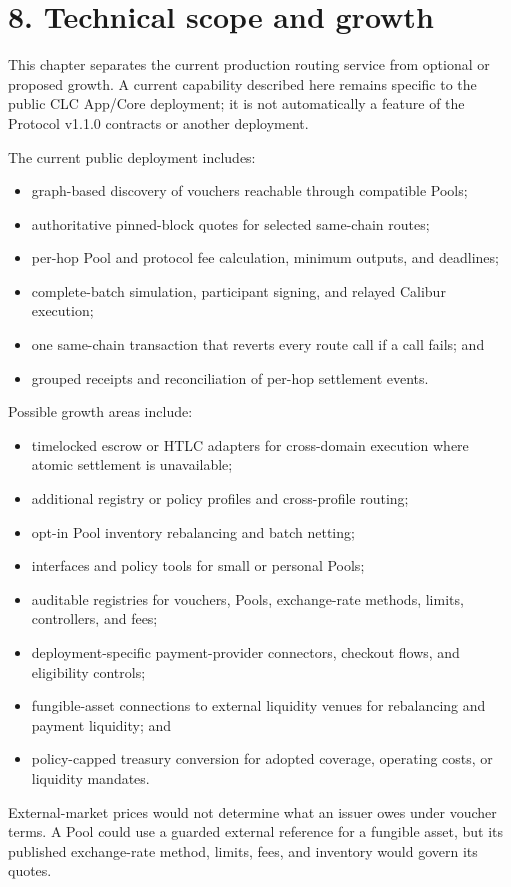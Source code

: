 \documentclass[11pt]{article}
\begin{document}
\section*{8. Technical scope and growth}

This chapter separates the current production routing service from optional or proposed growth. A current capability described here remains specific to the public CLC App/Core deployment; it is not automatically a feature of the Protocol v1.1.0 contracts or another deployment.

The current public deployment includes:

\begin{itemize}[leftmargin=*]
\item graph-based discovery of vouchers reachable through compatible Pools;
\item authoritative pinned-block quotes for selected same-chain routes;
\item per-hop Pool and protocol fee calculation, minimum outputs, and deadlines;
\item complete-batch simulation, participant signing, and relayed Calibur execution;
\item one same-chain transaction that reverts every route call if a call fails; and
\item grouped receipts and reconciliation of per-hop settlement events.
\end{itemize}
Possible growth areas include:

\begin{itemize}[leftmargin=*]
\item timelocked escrow or HTLC adapters for cross-domain execution where atomic settlement is unavailable;
\item additional registry or policy profiles and cross-profile routing;
\item opt-in Pool inventory rebalancing and batch netting;
\item interfaces and policy tools for small or personal Pools;
\item auditable registries for vouchers, Pools, exchange-rate methods, limits, controllers, and fees;
\item deployment-specific payment-provider connectors, checkout flows, and eligibility controls;
\item fungible-asset connections to external liquidity venues for rebalancing and payment liquidity; and
\item policy-capped treasury conversion for adopted coverage, operating costs, or liquidity mandates.
\end{itemize}
External-market prices would not determine what an issuer owes under voucher terms. A Pool could use a guarded external reference for a fungible asset, but its published exchange-rate method, limits, fees, and inventory would govern its quotes.
\end{document}
